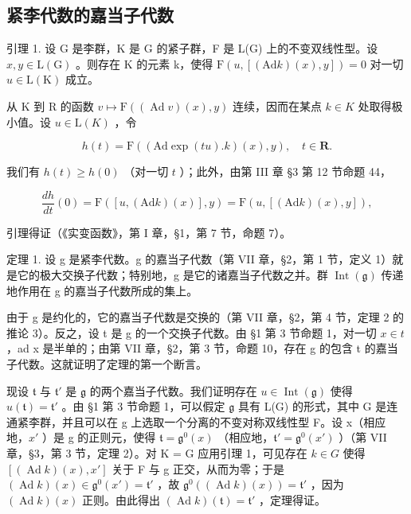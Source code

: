 \subsection{紧李代数的嘉当子代数}

引理 1. 设 G 是李群，K 是 G 的紧子群，F 是 L(G) 上的不变双线性型。设 \(x, y \in \mathrm{L}(\mathrm{G})\) 。则存在 K 的元素 k，使得 \(\mathrm{F}(u, [(\mathrm{Ad}k)(x), y]) = 0\) 对一切 \(u \in \mathrm{L}(\mathrm{K})\) 成立。

从 K 到 R 的函数 \(v \mapsto \mathrm{F}((\operatorname{Ad} v)(x), y)\) 连续，因而在某点 \(k \in K\) 处取得极小值。设 \(u \in \mathrm{L}(K)\) ，令

\[
h (t) = \mathrm{F} ((\mathrm{Ad} \exp (t u). k) (x), y), \quad t \in \mathbf {R}.
\]

我们有 \(h(t) \geq h(0)\) （对一切 \(t\) ）；此外，由第 III 章 §3 第 12 节命题 44，

\[
\frac {d h}{d t} (0) = \mathrm{F} ([ u, (\mathrm{Ad} k) (x) ], y) = \mathrm{F} (u, [ (\mathrm{Ad} k) (x), y ]),
\]

引理得证（《实变函数》，第 I 章，§1，第 7 节，命题 7）。

定理 1. 设 g 是紧李代数。g 的嘉当子代数（第 VII 章，§2，第 1 节，定义 1）就是它的极大交换子代数；特别地，g 是它的诸嘉当子代数之并。群 \(\operatorname{Int}(\mathfrak{g})\) 传递地作用在 g 的嘉当子代数所成的集上。

由于 g 是约化的，它的嘉当子代数是交换的（第 VII 章，§2，第 4 节，定理 2 的推论 3）。反之，设 t 是 g 的一个交换子代数。由 §1 第 3 节命题 1，对一切 \(x \in t\) ，ad x 是半单的；由第 VII 章，§2，第 3 节，命题 10，存在 g 的包含 t 的嘉当子代数。这就证明了定理的第一个断言。

现设 \(\mathfrak{t}\) 与 \(\mathfrak{t}'\) 是 \(\mathfrak{g}\) 的两个嘉当子代数。我们证明存在 \(u \in \operatorname{Int}(\mathfrak{g})\) 使得 \(u(\mathfrak{t}) = \mathfrak{t}'\) 。由 §1 第 3 节命题 1，可以假定 \(\mathfrak{g}\) 具有 L(G) 的形式，其中 G 是连通紧李群，并且可以在 g 上选取一个分离的不变对称双线性型 F。设 x（相应地，\(x'\) ）是 g 的正则元，使得 \(\mathfrak{t} = \mathfrak{g}^{0}(x)\) （相应地，\(\mathfrak{t}' = \mathfrak{g}^{0}(x')\) ）（第 VII 章，§3，第 3 节，定理 2）。对 K = G 应用引理 1，可见存在 \(k \in G\) 使得 \([(\operatorname{Ad} k)(x), x']\) 关于 F 与 g 正交，从而为零；于是 \((\operatorname{Ad} k)(x) \in \mathfrak{g}^{0}(x') = \mathfrak{t}'\) ，故 \(\mathfrak{g}^{0}((\operatorname{Ad} k)(x)) = \mathfrak{t}'\) ，因为 \((\operatorname{Ad} k)(x)\) 正则。由此得出 \((\operatorname{Ad} k)(\mathfrak{t}) = \mathfrak{t}'\) ，定理得证。

